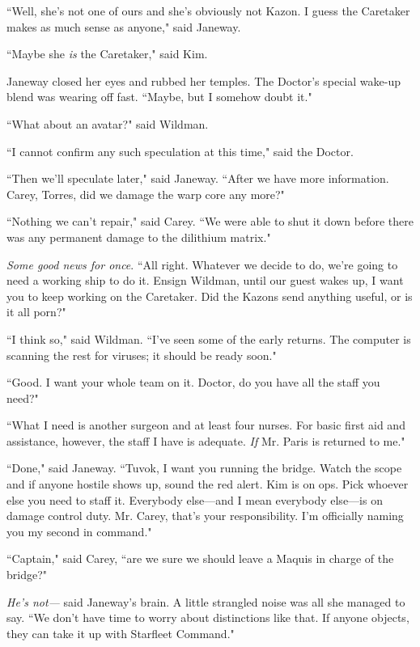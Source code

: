 \documentclass[twoside,letterpaper,12pt]{memoir}
\begin{document}
``Well, she's not one of ours and she's obviously not Kazon. I guess the Caretaker makes as much sense as anyone," said Janeway. 

``Maybe she \textit{is} the Caretaker," said Kim. 

Janeway closed her eyes and rubbed her temples. The Doctor's special wake-up blend was wearing off fast. ``Maybe, but I somehow doubt it." 

``What about an avatar?" said Wildman. 

``I cannot confirm any such speculation at this time," said the Doctor. 

``Then we'll speculate later," said Janeway. ``After we have more information. Carey, Torres, did we damage the warp core any more?" 

``Nothing we can't repair," said Carey. ``We were able to shut it down before there was any permanent damage to the dilithium matrix." 

\textit{Some good news for once}. ``All right. Whatever we decide to do, we're going to need a working ship to do it. Ensign Wildman, until our guest wakes up, I want you to keep working on the Caretaker. Did the Kazons send anything useful, or is it all porn?" 

``I think so," said Wildman. ``I've seen some of the early returns. The computer is scanning the rest for viruses; it should be ready soon." 

``Good. I want your whole team on it. Doctor, do you have all the staff you need?" 

``What I need is another surgeon and at least four nurses. For basic first aid and assistance, however, the staff I have is adequate. \textit{If} Mr. Paris is returned to me." 

``Done," said Janeway. ``Tuvok, I want you running the bridge. Watch the scope and if anyone hostile shows up, sound the red alert. Kim is on ops. Pick whoever else you need to staff it. Everybody else---and I mean everybody else---is on damage control duty. Mr. Carey, that's your responsibility. I'm officially naming you my second in command." 

``Captain," said Carey, ``are we sure we should leave a Maquis in charge of the bridge?" 

\textit{He's not---} said Janeway's brain. A little strangled noise was all she managed to say. ``We don't have time to worry about distinctions like that. If anyone objects, they can take it up with Starfleet Command." 
\end{document}
